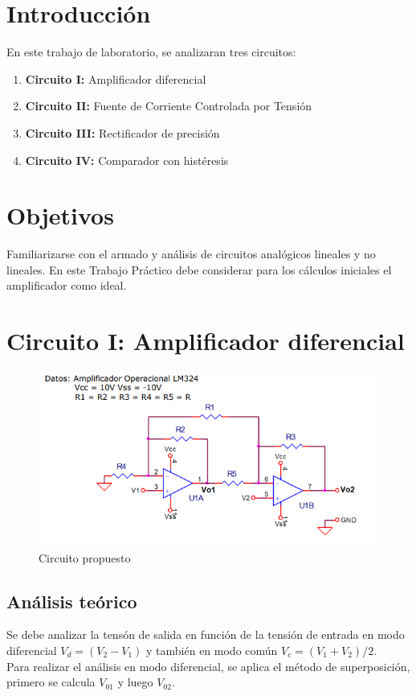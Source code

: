 \documentclass[11pt, a4paper]{article}
\begin{document}

\section{Introducción}
En este trabajo de laboratorio, se analizaran tres circuitos:
\begin{enumerate}
    \item \textbf{Circuito I:} Amplificador diferencial
    \item \textbf{Circuito II:} Fuente de Corriente Controlada por Tensión
    \item \textbf{Circuito III:} Rectificador de precisión
    \item \textbf{Circuito IV:} Comparador con histéresis
\end{enumerate}
\section{Objetivos}
Familiarizarse con el armado y análisis de circuitos analógicos lineales y no lineales. En este Trabajo Práctico debe considerar para los cálculos iniciales el amplificador como ideal. 
\section{Circuito I: Amplificador diferencial}
\begin{figure}[htb]
	\centering
	\includegraphics[width=1\textwidth]{Imagenes/circuito_consigna.png}
	\caption{Circuito propuesto}
\end{figure}
\subsection{Análisis teórico}
Se debe analizar la tensón de salida en función de la tensión de entrada en modo diferencial $ V_d=(V_2-V_1)$ y también en modo común $V_c=(V_1+V_2)/2$.\\
Para realizar el análisis en modo diferencial, se aplica el método de superposición, primero se calcula $V_{01}$ y luego $V_{02}$.
\end{document}
